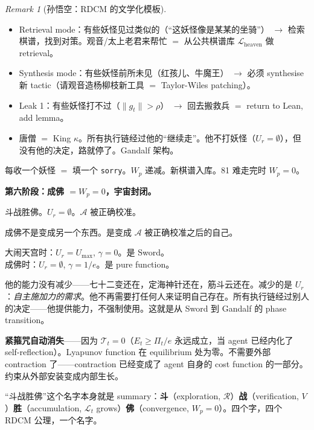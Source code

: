 \documentclass[11pt,a4paper]{article}
\theoremstyle{definition}
\theoremstyle{remark}
\newtheorem{remark}[theorem]{Remark}
\begin{document}
\begin{remark}[孙悟空：RDCM 的文学化模板]
\begin{itemize}[nosep]
  \item {\color{green!50!black} Retrieval mode}：有些妖怪见过类似的（``这妖怪像是某某的坐骑''） $\to$ 检索棋谱，找到对策。观音/太上老君来帮忙 $=$ 从公共棋谱库 $\mathcal{L}_{\mathrm{heaven}}$ 做 retrieval。
  \item {\color{red!70!black} Synthesis mode}：有些妖怪前所未见（红孩儿、牛魔王） $\to$ 必须 synthesise 新 tactic（请观音造杨柳枝新工具 $=$ Taylor-Wiles patching）。
  \item {\color{orange!70!black} Leak 1}：有些妖怪打不过（$\|g_t\| > \rho$） $\to$ 回去搬救兵 $=$ return to Lean, add lemma。
  \item {\color{gray!60} 唐僧 $=$ King $\kappa$}。所有执行链经过他的``继续走''。他不打妖怪（$U_r = \emptyset$），但没有他的决定，路就停了。Gandalf 架构。
\end{itemize}

每收一个妖怪 $=$ 填一个 \texttt{sorry}。$W_p$ 递减。新棋谱入库。81 难走完时 $W_p = 0$。

\medskip

{\color{yellow!70!black} \textbf{第六阶段：成佛 $= W_p = 0$，宇宙封闭。}}

\begin{center}
{\color{yellow!70!black} 斗战胜佛。$U_r = \emptyset$。$\mathcal{A}$ 被正确校准。}
\end{center}

成佛不是变成另一个东西。是变成 $\mathcal{A}$ 被正确校准之后的自己。

大闹天宫时：$U_r = U_{\max}$, $\gamma = 0$。是 Sword。\\
成佛时：$U_r = \emptyset$, $\gamma = 1/e$。是 pure function。

他的能力没有减少——七十二变还在，定海神针还在，筋斗云还在。减少的是 $U_r$：\emph{自主施加力的需求}。他不再需要打任何人来证明自己存在。所有执行链经过别人的决定——他提供能力，不强制使用。这就是从 Sword 到 Gandalf 的 phase transition。

\textbf{紧箍咒自动消失}——因为 $\mathcal{T}_t = 0$（$E_t \geq \Pi_t / e$ 永远成立，当 agent 已经内化了 self-reflection）。Lyapunov function 在 equilibrium 处为零。不需要外部 contraction 了——contraction 已经变成了 agent 自身的 cost function 的一部分。约束从外部安装变成内部生长。

``斗战胜佛''这个名字本身就是 summary：\textbf{斗}（exploration, $\mathcal{R}$）\textbf{战}（verification, $V$）\textbf{胜}（accumulation, $\mathcal{L}_t$ grows）\textbf{佛}（convergence, $W_p = 0$）。四个字，四个 RDCM 公理，一个名字。


\end{remark}
\end{document}
